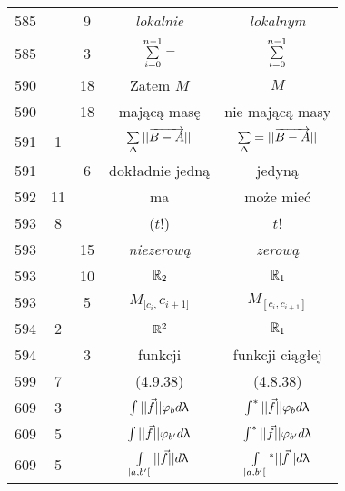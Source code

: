 \documentclass[a4paper,11pt]{article}
\newcommand{\IntL}{\int\limits}
\newcommand{\vp}{\varphi}
\newcommand{\ora}{\overrightarrow}
\begin{document}
\begin{center}
\begin{tabular}{|c|c|c|c|c|}
    585 & & 9 & \emph{lokalnie} & \emph{lokalnym} \\
    585 & & 3 & $\sum\limits_{ i = 0 }^{ n - 1 } =$
           & $\sum\limits_{ i = 0 }^{ n - 1 }$ \\
    590 & & 18 & Zatem $M$ & $M$ \\
    590 & & 18 & mającą masę & nie mającą masy \\
    591 & 1 & & $\Sum_{ \Delta } || \ora{ B - A } ||$
           & $\Sum_{ \Delta } = || \ora{ B - A } ||$ \\
    591 & & 6 & dokładnie jedną & jedyną \\
    592 & 11 & & ma & może mieć \\
    593 & 8 & & ($ t $!) & $ t $! \\
    593 & & 15 & \emph{niezerową} & \emph{zerową} \\
    593 & & 10 & $\mathbb{R}_{ 2 }$ & $\mathbb{R}_{ 1 }$ \\
    593 & & 5 & $M_{ [ c_{ i }, } c_{ i + 1 ] }$
           & $M_{ [ c_{ i }, c_{ i + 1 } ] }$ \\
    594 & 2 & & $\mathbb{R}^{ 2 }$ & $\mathbb{R}_{ 1 }$ \\
    594 & & 3 & funkcji & funkcji ciągłej \\
    599 & 7 & & (4.9.38) & (4.8.38) \\
    609 & 3 & & $\int || \vec{ f } || \vp_{ b } d\la$
           & $\int^{ * } || \vec{ f } || \vp_{ b } d\la$ \\
    609 & 5 & & $\int || \vec{ f } || \vp_{ b' } d\la$
           & $\int^{ * } || \vec{ f } || \vp_{ b' } d\la$ \\
    609 & 5 & & $\IntL_{ | a, b' [ } || \vec{ f } || d\la$
           & $\IntL_{ | a, b' [ }{^{ * }}
             || \vec{ f } || d\la$ \\ \hline
  \end{tabular}


\end{center}
\end{document}
